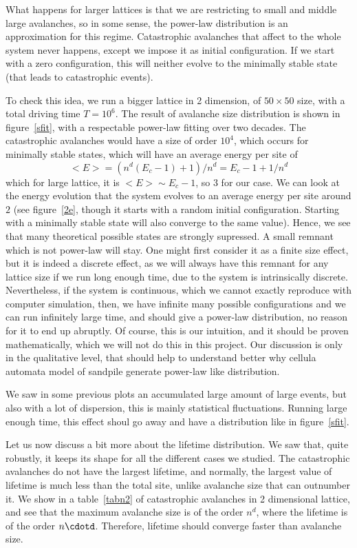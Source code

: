 What happens for larger lattices is that we are restricting to small and middle large avalanches, so in some sense,
the power-law distribution is an approximation for this regime. 
Catastrophic avalanches that affect to the whole system never happens, except we impose it as initial configuration.
If we start with a zero configuration, this will neither evolve to the minimally stable state (that leads to catastrophic events). 

To check this idea, we run a bigger lattice in 2 dimension, of $50\times 50$ size, with a total driving time $T=10^6$. 
The result of avalanche size distribution is shown in figure~\ref{sfit}, with a respectable power-law fitting over two decades.
The catastrophic avalanches would have a size of order  $10^4$, which occurs for minimally stable states, which will have an average energy per site of
\[
<E>=(n^d(E_c-1)+1)/n^d=E_c-1+1/n^d
\]
which for large lattice, it is $<E>\sim E_c-1$, so $3$ for our case. We can look at the energy evolution that the system evolves to an
average energy per site around $2$ (see figure~\ref{2e}, though it starts with a random initial configuration. 
Starting with a minimally stable state will also converge to the same value).
Hence, we see that many theoretical possible states are strongly supressed. 
A small remnant which is not power-law will stay. One might first consider it as a finite size effect, 
but it is indeed a discrete effect, as we will always have this remnant for any lattice size if we run long enough time, 
due to the system is intrinsically discrete.
Nevertheless, if the system is continuous, which we cannot exactly reproduce with computer simulation, 
then, we have infinite many possible configurations and we can run infinitely large time, 
and should give a power-law distribution, no reason for it to end up abruptly.
Of course, this is our intuition, and it should be proven mathematically, which we will not do this in this project.
Our discussion is only in the qualitative level, that should help to understand better why cellula automata model of sandpile 
generate power-law like distribution.

We saw in some previous plots an accumulated large amount of large events, but also with a lot of dispersion, 
this is mainly statistical fluctuations. Running large enough time, this effect shoul go away and have a distribution like in figure~\ref{sfit}.

Let us now discuss a bit more about the lifetime distribution.  We saw that, quite robustly, it keeps its shape for all the different cases we studied.
The catastrophic avalanches do not have the largest lifetime, and normally, the largest value of lifetime is much less than the total site, unlike avalanche size that can outnumber it.
We show in a table~\ref{tabn2} of catastrophic avalanches in 2 dimensional lattice, and see that the maximum avalanche size is of the order $n^d$, where the lifetime is of the order $n\cdotd$.
Therefore, lifetime should converge faster than avalanche size.

